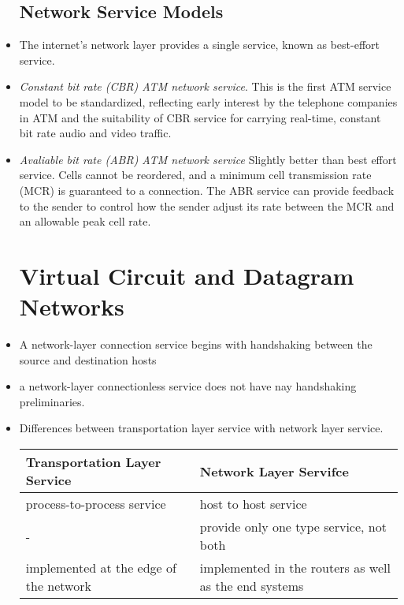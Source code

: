 \message{ !name(chapter4.tex)}\documentclass{article}
\begin{document}
\begin{itemize}
\subsection{Network Service Models}
\item The internet's network layer provides a single service, known as
  best-effort service.
\item \emph{Constant bit rate (CBR) ATM network service}. This is the
    first ATM service model to be standardized, reflecting early
    interest by the telephone companies in ATM and the suitability of
    CBR service for carrying real-time, constant bit rate audio and
    video traffic.
\item \emph{Avaliable bit rate (ABR) ATM network service} Slightly
  better than best effort service. Cells cannot be reordered, and a
  minimum cell transmission rate (MCR) is guaranteed to a
  connection. The ABR service can provide feedback to the sender to
  control how the sender adjust its rate between the MCR and an
  allowable peak cell rate.
\section{Virtual Circuit and Datagram Networks}
\item A network-layer connection service begins with handshaking
  between the source and destination hosts
\item a network-layer connectionless service does not have nay
  handshaking preliminaries.
\item Differences between transportation layer service with network
  layer service. 
\begin{center}
\begin{tabular}{|p{5cm}|p{5cm}|}
  \hline
  Transportation Layer Service & Network Layer Servifce \\ \hline
  process-to-process service   & host to host service \\ \hline
  -                            & provide only one type service, not
  both \\ \hline
  implemented at the edge of the network
                               & implemented in the routers as well as
                               the end systems \\ \hline
  
\end{tabular}
\end{center}

\end{itemize}
\end{document}
